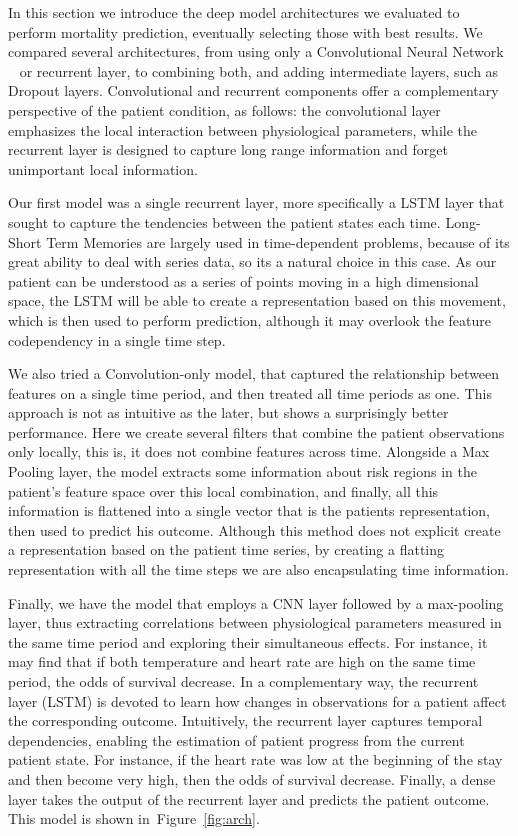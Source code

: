 In this section we introduce the deep model architectures we evaluated to perform mortality prediction, eventually selecting those with best results. We compared several architectures, from using only a Convolutional Neural Network ~\citep{nips} or recurrent layer, to combining both, and adding intermediate layers, such as Dropout layers. Convolutional and recurrent components offer a complementary perspective of the patient condition, as follows: the convolutional layer emphasizes the local interaction between physiological parameters, while the recurrent layer is designed to capture long range information and forget unimportant local information. 

Our first model was a single recurrent layer, more specifically a LSTM layer that sought to capture the tendencies between the patient states each time. Long-Short Term Memories are largely used in time-dependent problems, because of its great ability to deal with series data, so its a natural choice in this case. As our patient can be understood as a series of points moving in a high dimensional space, the LSTM will be able to create a representation based on this movement, which is then used to perform prediction, although it may overlook the feature codependency in a single time step.

We also tried a Convolution-only model, that captured the relationship between features on a single time period, and then treated all time periods as one. This approach is not as intuitive as the later, but shows a surprisingly better performance. Here we create several filters that combine the patient observations only locally, this is, it does not combine features across time. Alongside a Max Pooling layer, the model extracts some information about risk regions in the patient's feature space over this local combination, and finally, all this information is flattened into a single vector that is the patients representation, then used to predict his outcome. Although this method does not explicit create a representation based on the patient time series, by creating a flatting representation with all the time steps we are also encapsulating time information.

Finally, we have the model that employs a CNN layer followed by a max-pooling layer, thus extracting correlations between physiological parameters measured in the same time period and exploring their simultaneous effects. For instance, it may find that if both temperature and heart rate are high on the same time period, the odds of survival decrease. In a complementary way, the recurrent layer (LSTM) is devoted to learn how changes in observations for a patient affect the corresponding outcome. Intuitively, the recurrent layer captures temporal dependencies, enabling the estimation of patient progress from the current patient state. For instance, if the heart rate was low at the beginning of the stay and then become very high, then the odds of survival decrease. Finally, a dense layer takes the output of the recurrent layer and predicts the patient outcome. This model is shown in~Figure~\ref{fig:arch}.

